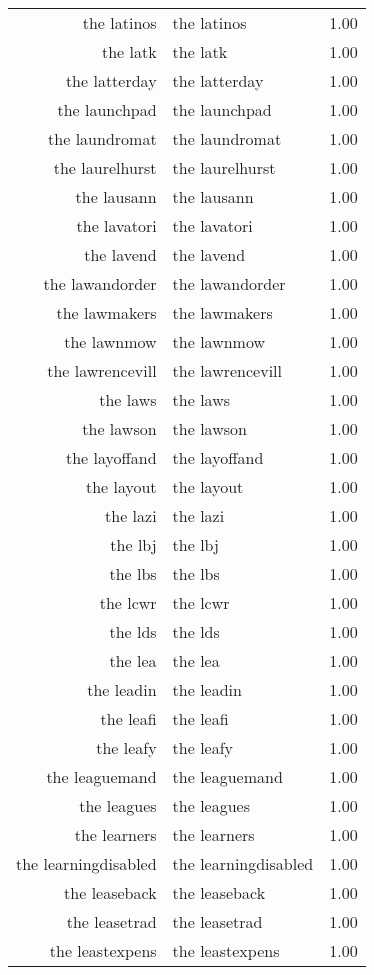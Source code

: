 \begin{table}[ht]
\begin{tabular}{rlr}
  the latinos & the latinos & 1.00 \\ 
  the latk & the latk & 1.00 \\ 
  the latterday & the latterday & 1.00 \\ 
  the launchpad & the launchpad & 1.00 \\ 
  the laundromat & the laundromat & 1.00 \\ 
  the laurelhurst & the laurelhurst & 1.00 \\ 
  the lausann & the lausann & 1.00 \\ 
  the lavatori & the lavatori & 1.00 \\ 
  the lavend & the lavend & 1.00 \\ 
  the lawandorder & the lawandorder & 1.00 \\ 
  the lawmakers & the lawmakers & 1.00 \\ 
  the lawnmow & the lawnmow & 1.00 \\ 
  the lawrencevill & the lawrencevill & 1.00 \\ 
  the laws & the laws & 1.00 \\ 
  the lawson & the lawson & 1.00 \\ 
  the layoffand & the layoffand & 1.00 \\ 
  the layout & the layout & 1.00 \\ 
  the lazi & the lazi & 1.00 \\ 
  the lbj & the lbj & 1.00 \\ 
  the lbs & the lbs & 1.00 \\ 
  the lcwr & the lcwr & 1.00 \\ 
  the lds & the lds & 1.00 \\ 
  the lea & the lea & 1.00 \\ 
  the leadin & the leadin & 1.00 \\ 
  the leafi & the leafi & 1.00 \\ 
  the leafy & the leafy & 1.00 \\ 
  the leaguemand & the leaguemand & 1.00 \\ 
  the leagues & the leagues & 1.00 \\ 
  the learners & the learners & 1.00 \\ 
  the learningdisabled & the learningdisabled & 1.00 \\ 
  the leaseback & the leaseback & 1.00 \\ 
  the leasetrad & the leasetrad & 1.00 \\ 
  the leastexpens & the leastexpens & 1.00 \\ 

\end{tabular}
\end{table}

